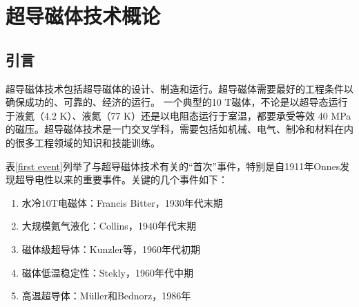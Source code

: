 \chapter{超导磁体技术概论}
\section{引言}
超导磁体技术包括超导磁体的设计、制造和运行。超导磁体需要最好的工程条件以确保成功的、可靠的、经济的运行。
一个典型的10 T磁体，不论是以超导态运行于液氦（4.2 K）、液氮（77 K）还是以电阻态运行于室温，都要承受等效
40 MPa的磁压。超导磁体技术是一门交叉学科，需要包括如机械、电气、制冷和材料在内的很多工程领域的知识和技能训练。

表\ref{first event}列举了与超导磁体技术有关的“首次”事件，特别是自1911年Onnes发现超导电性以来的重要事件。关键的几个事件如下：
\begin{enumerate}
  \item 水冷10T电磁体：Francis Bitter，1930年代末期
  \item 大规模氦气液化：Collins，1940年代末期
  \item 磁体级超导体：Kunzler等，1960年代初期
  \item 磁体低温稳定性：Stekly，1960年代中期
  \item 高温超导体：Müller和Bednorz，1986年
\end{enumerate}

